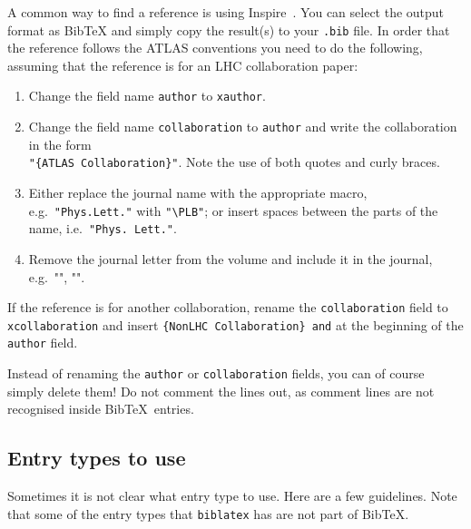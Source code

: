 \documentclass[UKenglish, texlive=2016]{\ATLASLATEXPATH atlasdoc}
\newcommand*{\BibTeX}{Bib\TeX}
\newcommand{\File}[1]{\texttt{#1}\xspace}
\newcommand{\Package}[1]{\texttt{#1}\xspace}
\begin{document}
A common way to find a reference is using Inspire~\cite{inspire}.
You can select the output format as BibTeX and simply copy the result(s) to your \File{.bib} file.
In order that the reference follows the ATLAS conventions you need to do the following,
assuming that the reference is for an LHC collaboration paper:
\begin{enumerate}
\item Change the field name \texttt{author} to \texttt{xauthor}.
\item Change the field name \texttt{collaboration} to \texttt{author} and write the collaboration in the form\\
  \verb|"{ATLAS Collaboration}"|. Note the use of both quotes and curly braces.
\item Either replace the journal name with the appropriate macro, e.g.\ \verb|"Phys.Lett."| with
  \verb|"\PLB"|; or insert spaces between the parts of the name, i.e.\ \verb|"Phys. Lett."|.
\item Remove the journal letter from the volume and include it in the journal,
  e.g.\ "\EPJC", "\PRD".
\end{enumerate}
If the reference is for another collaboration, rename the \texttt{collaboration} field to
\texttt{xcollaboration} and insert \verb|{NonLHC Collaboration} and| at the beginning of the
\texttt{author} field.

Instead of renaming the \texttt{author} or \texttt{collaboration} fields, you can of course simply delete them!
Do not comment the lines out, as comment lines are not recognised inside \BibTeX\ entries.


\subsection{Entry types to use}

Sometimes it is not clear what entry type to use.
Here are a few guidelines.
Note that some of the entry types that \Package{biblatex} has are not part of \BibTeX.
\end{document}
